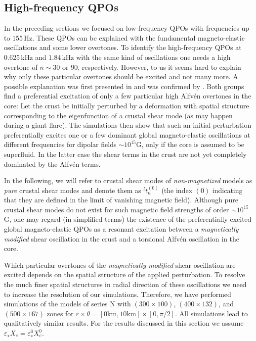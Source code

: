 \documentclass[useAMS,usenatbib]{mnras}
\begin{document}
\subsection{High-frequency QPOs}\label{sec_high}

In the preceding sections \citep[and in][]{Gabler2016} we focused on 
low-frequency QPOs  with frequencies up to $155\,$Hz. These QPOs can be 
explained with the fundamental magneto-elastic oscillations and some lower 
overtones. To identify the high-frequency QPOs at $0.625\,$kHz and $1.84\,$kHz 
with the same kind of oscillations one needs a high overtone of $n\sim30$ or 
$90$, 
respectively. However, to us it seems hard to explain why only these 
particular overtones should be excited and not many more. A possible explanation 
was first presented in \cite{Gabler2013a} and was confirmed by 
\cite{Passamonti2013}. Both groups find a preferential 
excitation of only a few particular high Alfv\'en overtones in the core: Let the 
crust be initially perturbed by a deformation with spatial 
structure corresponding to the eigenfunction of a crustal shear mode 
(as may happen during a giant flare). The simulations then show that  
such an initial perturbation preferentially excites one or a 
few dominant global magneto-elastic oscillations at different frequencies for 
dipolar fields $\sim 10^{15}$G, only if the core is assumed to be superfluid. In 
the latter case the shear terms in the crust are not yet completely dominated by 
the Alfv\'en terms.

In the following, we will refer to  crustal shear modes of 
 \textit{non-magnetized} models as \textit{pure} crustal shear modes and
denote them as ${}^l t^{(0)}_n$ (the index $(0)$ indicating that they are
defined in the limit of vanishing magnetic field). Although pure 
crustal shear modes do not exist for such magnetic field strengths of order 
$\sim 10^{15}$G, one may regard (in simplified terms) the existence of the 
preferentially excited global magneto-elastic QPOs as a resonant excitation 
between a \textit{magnetically modified} shear oscillation in the crust and a 
torsional Alfv\'en oscillation in the core.



Which particular overtones of the \textit{magnetically modified} shear 
oscillation are excited depends on the spatial 
structure of the applied perturbation. 
To resolve the much finer spatial structures in radial direction of these 
oscillations we need to increase the resolution of our simulations. Therefore, 
we have performed simulations of the models of series N with $(300\times100)$, 
$(400\times132)$, and $(500\times167)$ zones for 
$r\times\theta=[0\mathrm{km},10\mathrm{km}]\times[0,\pi/2]$. All simulations 
lead to qualitatively similar results. For the results discussed in this section 
we assume $\varepsilon_\star X_c=\varepsilon_\star^0 X_c^0$.
\end{document}
